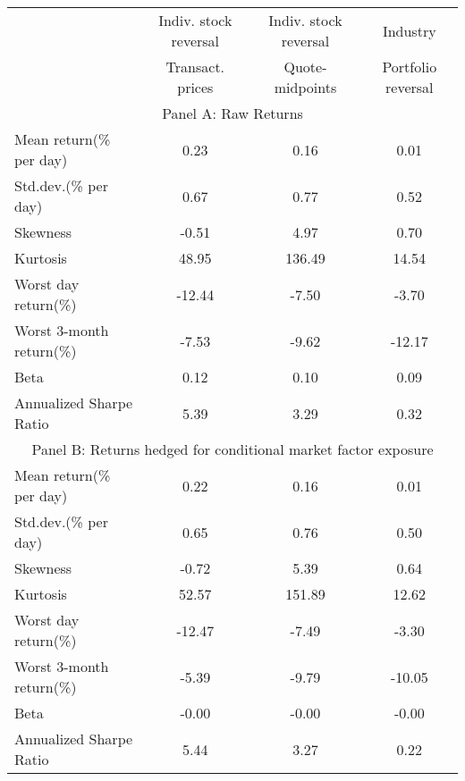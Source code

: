 \begin{tabular}{lccc}
\toprule
& Indiv. stock reversal & Indiv. stock reversal & Industry \\
& Transact. prices & Quote-midpoints & Portfolio reversal \\
\midrule
\multicolumn{4}{c}{Panel A: Raw Returns} \\
\midrule
Mean return(\% per day) & 0.23 & 0.16 & 0.01 \\
Std.dev.(\% per day) & 0.67 & 0.77 & 0.52 \\
Skewness & -0.51 & 4.97 & 0.70 \\
Kurtosis & 48.95 & 136.49 & 14.54 \\
Worst day return(\%) & -12.44 & -7.50 & -3.70 \\
Worst 3-month return(\%) & -7.53 & -9.62 & -12.17 \\
Beta & 0.12 & 0.10 & 0.09 \\
Annualized Sharpe Ratio & 5.39 & 3.29 & 0.32 \\
\midrule
\multicolumn{4}{c}{Panel B: Returns hedged for conditional market factor exposure} \\
\midrule
Mean return(\% per day) & 0.22 & 0.16 & 0.01 \\
Std.dev.(\% per day) & 0.65 & 0.76 & 0.50 \\
Skewness & -0.72 & 5.39 & 0.64 \\
Kurtosis & 52.57 & 151.89 & 12.62 \\
Worst day return(\%) & -12.47 & -7.49 & -3.30 \\
Worst 3-month return(\%) & -5.39 & -9.79 & -10.05 \\
Beta & -0.00 & -0.00 & -0.00 \\
Annualized Sharpe Ratio & 5.44 & 3.27 & 0.22 \\
\bottomrule
\end{tabular}